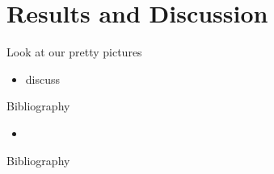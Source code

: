 \documentclass[8pt,t]{beamer}
\begin{document}
\section{Results and Discussion}
\begin{frame}{Look at our pretty pictures}
    \begin{itemize}
        \item discuss
    \end{itemize}
\end{frame}


\begin{frame}{Bibliography}
    \begin{itemize}
        \item \cite{analytical-benchmark} \cite{aya2023} \cite{brown-entropy-2006} \cite{dufek} \cite{lindsay2022moose} \cite{nekrs} \cite{novak-2023} \cite{novak2022-cardinal} \cite{openmc}
    \end{itemize}
\end{frame}

\begin{frame}[allowframebreaks]{Bibliography}
    \tiny
    \printbibliography
\end{frame}
\end{document}
